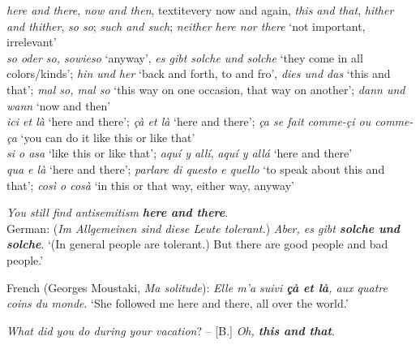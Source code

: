 \documentclass[output=paper,colorlinks,citecolor=brown]{langscibook}
\begin{document}
\ea\label{ex:koenig:4}
 \textit{here and there}, \textit{now and then}, textit{every now and again}, \textit{this and that}, \textit{hither and thither}, \textit{so so}; \textit{such and such}; \textit{neither here nor there} ‘not important, irrelevant’\\
 \textit{so oder so, sowieso} ‘anyway’, \textit{es gibt solche und solche} ‘they come in all colors/kinds’; \textit{hin und her} ‘back and forth, to and fro’, \textit{dies und das} ‘this and that’; \textit{mal so, mal so} ‘this way on one occasion, that way on another’; \textit{dann und wann} ‘now and then’\\
 \textit{ici et là} ‘here and there’; \textit{çà et là} ‘here and there’; \textit{ça se fait comme-çi ou comme-ça} ‘you can do it like this or like that’ \\
 \textit{si o asa} ‘like this or like that’; \textit{aquí y allí}, \textit{aquí y allá} ‘here and there’\\
 \textit{qua e là} ‘here and there’; \textit{parlare di questo e quello} ‘to speak about this and that’; \textit{così o cosà} ‘in this or that way, either way, anyway’\\
\z
\z

\ea\label{ex:koenig:5}
\ea \textit{You still find antisemitism \textbf{here and there}}.\\
\ex German: (\textit{Im Allgemeinen sind diese Leute tolerant.}) \textit{Aber, es gibt \textbf{solche und solche}}. ‘(In general people are tolerant.) But there are good people and bad people.’

\ex French (Georges Moustaki, \textit{Ma solitude}): \textit{Elle m’a suivi \textbf{çà et là}, aux quatre coins du monde}. ‘She followed me here and there, all over the world.’

\ex {[A.]} \textit{What did you do during your vacation}? – {[B.]} \textit{Oh, \textbf{this and that}}.\\
\z
\z
\end{document}
